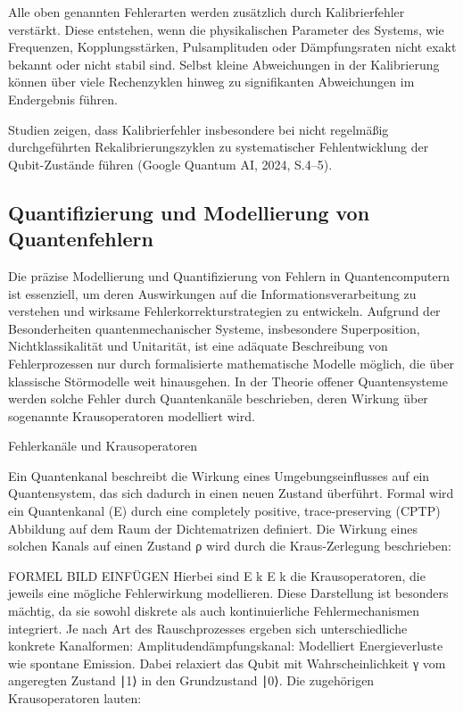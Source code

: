 Alle oben genannten Fehlerarten werden zusätzlich durch Kalibrierfehler verstärkt. Diese entstehen, wenn die physikalischen Parameter des Systems, wie Frequenzen, Kopplungsstärken, Pulsamplituden oder Dämpfungsraten nicht exakt bekannt oder nicht stabil sind. Selbst kleine Abweichungen in der Kalibrierung können über viele Rechenzyklen hinweg zu signifikanten Abweichungen im Endergebnis führen.

Studien zeigen, dass Kalibrierfehler insbesondere bei nicht regelmäßig durchgeführten Rekalibrierungszyklen zu systematischer Fehlentwicklung der Qubit-Zustände führen (Google Quantum AI, 2024, S.4–5).

\subsection{Quantifizierung und Modellierung von Quantenfehlern}
Die präzise Modellierung und Quantifizierung von Fehlern in Quantencomputern ist essenziell, um deren Auswirkungen auf die Informationsverarbeitung zu verstehen und wirksame Fehlerkorrekturstrategien zu entwickeln. Aufgrund der Besonderheiten quantenmechanischer Systeme, insbesondere Superposition, Nichtklassikalität und Unitarität, ist eine adäquate Beschreibung von Fehlerprozessen nur durch formalisierte mathematische Modelle möglich, die über klassische Störmodelle weit hinausgehen. In der Theorie offener Quantensysteme werden solche Fehler durch Quantenkanäle beschrieben, deren Wirkung über sogenannte Krausoperatoren modelliert wird.

Fehlerkanäle und Krausoperatoren

Ein Quantenkanal beschreibt die Wirkung eines Umgebungseinflusses auf ein Quantensystem, das sich dadurch in einen neuen Zustand überführt. Formal wird ein Quantenkanal (E) durch eine completely positive, trace-preserving (CPTP) Abbildung auf dem Raum der Dichtematrizen definiert. Die Wirkung eines solchen Kanals auf einen Zustand ρ wird durch die Kraus-Zerlegung beschrieben:

FORMEL BILD EINFÜGEN
Hierbei sind  E k E  k die Krausoperatoren, die jeweils eine mögliche Fehlerwirkung modellieren. Diese Darstellung ist besonders mächtig, da sie sowohl diskrete als auch kontinuierliche Fehlermechanismen integriert. Je nach Art des Rauschprozesses ergeben sich unterschiedliche konkrete Kanalformen:
Amplitudendämpfungskanal: Modelliert Energieverluste wie spontane Emission. Dabei relaxiert das Qubit mit Wahrscheinlichkeit 
γ vom angeregten Zustand ∣1⟩ in den Grundzustand ∣0⟩. Die zugehörigen Krausoperatoren lauten:

